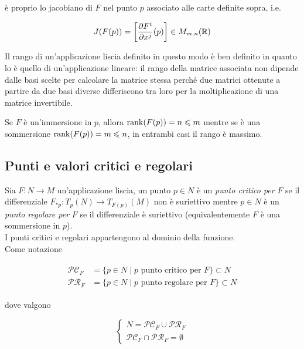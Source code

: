 è proprio lo jacobiano di $ F $ nel punto $ p $ associato alle carte definite sopra, i.e.

\begin{equation}
	J(F(p)) = \left[ \dfrac{\partial F^{i}}{\partial x^{j}} (p) \right] \in M_{m,n}(\mathbb{R})
\end{equation}

Il rango di un'applicazione liscia definito in questo modo è ben definito in quanto lo è quello di un'applicazione lineare: il rango della matrice associata non dipende dalle basi scelte per calcolare la matrice stessa perché due matrici ottenute a partire da due basi diverse differiscono tra loro per la moltiplicazione di una matrice invertibile.

\begin{remark}
	Se $ F $ è un'immersione in $ p $, allora $ \rank(F(p)) = n \leqslant m $ mentre se è una sommersione $ \rank(F(p)) = m \leqslant n $, in entrambi casi il rango è massimo.
\end{remark}

\subsection{Punti e valori critici e regolari}

Sia $ F : N \to M $ un'applicazione liscia, un punto $ p \in N $ è un \textit{punto critico per} $ F $ se il differenziale $ F_{*p} : T_{p}(N) \to T_{F(p)}(M) $ non è suriettivo mentre $ p \in N $ è un \textit{punto regolare per} $ F $ se il differenziale è suriettivo (equivalentemente $ F $ è una sommersione in $ p $).\\
I punti critici e regolari appartengono al dominio della funzione.\\
Come notazione

\begin{align}
	\begin{split}
		\mathcal{PC}_{F} &= \{ p \in N \mid p \text{ punto critico per } F \} \subset N\\
		\mathcal{PR}_{F} &= \{ p \in N \mid p \text{ punto regolare per } F \} \subset N
	\end{split}
\end{align}

dove valgono

\begin{equation}
	\begin{cases}
		N = \mathcal{PC}_{F} \cup \mathcal{PR}_{F}\\
		\mathcal{PC}_{F} \cap \mathcal{PR}_{F} = \emptyset
	\end{cases}
\end{equation}

